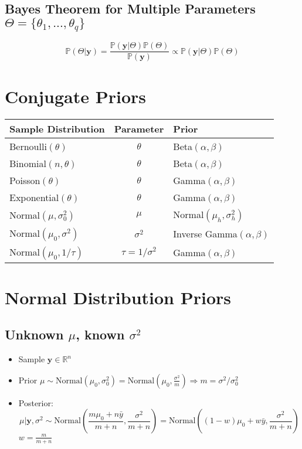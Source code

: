 \documentclass[12pt]{article}
\theoremstyle{definition}
\newcommand{\Prob}[1]{\mathbb{P}(#1)}
\begin{document}
\subsection*{Bayes Theorem for Multiple Parameters $\Theta = \{\theta_1,...,\theta_q\}$}
$$\Prob{\Theta|\bm{y}} = \frac{\Prob{\bm{y}|\Theta}\Prob{\Theta}}{\Prob{\bm{y}}} \propto \Prob{\bm{y}|\Theta}\Prob{\Theta}$$

\newpage
\section{Conjugate Priors}
\begin{center}
    \begin{tabular}{|l|c|l|}
        \hline
        Sample Distribution & Parameter & Prior\\
        \hline\hline
        Bernoulli$(\theta)$ & $\theta$ & Beta$(\alpha,\beta)$\\
        \hline
        Binomial$(n,\theta)$ & $\theta$ & Beta$(\alpha,\beta)$\\
        \hline
        Poisson$(\theta)$ & $\theta$ & Gamma$(\alpha,\beta)$\\
        \hline
        Exponential$(\theta)$ & $\theta$ & Gamma$(\alpha,\beta)$\\
        \hline
        Normal$(\mu,\sigma_0^2)$ & $\mu$ & Normal$(\mu_h,\sigma_h^2)$\\
        \hline
        Normal$(\mu_0,\sigma^2)$ & $\sigma^2$ & Inverse Gamma$(\alpha,\beta)$\\
        \hline
        Normal$(\mu_0,1/\tau)$ & $\tau = 1/\sigma^2$ & Gamma$(\alpha,\beta)$\\
        \hline
    \end{tabular}
\end{center}
\section{Normal Distribution Priors}
    \subsection*{Unknown $\mu$, known $\sigma^2$}
    \begin{itemize}
        \item Sample $\bm{y} \in \mathbb{R}^n$
        \item Prior $\mu \sim \text{Normal}(\mu_0,\sigma_0^2) = \text{Normal}\left(\mu_0,\frac{\sigma^2}{m}\right) \Rightarrow m = \sigma^2/\sigma_0^2$
        \item Posterior: $$\mu|\bm{y},\sigma^2 \sim \text{Normal}\left( \frac{m\mu_0 + n\bar{y}}{m+n} , \frac{\sigma^2}{m+n} \right) = \text{Normal}\left( (1-w)\mu_0 + w\bar{y} , \frac{\sigma^2}{m+n} \right)$$
            $w = \frac{m}{m+n}$
    \end{itemize}
\end{document}

